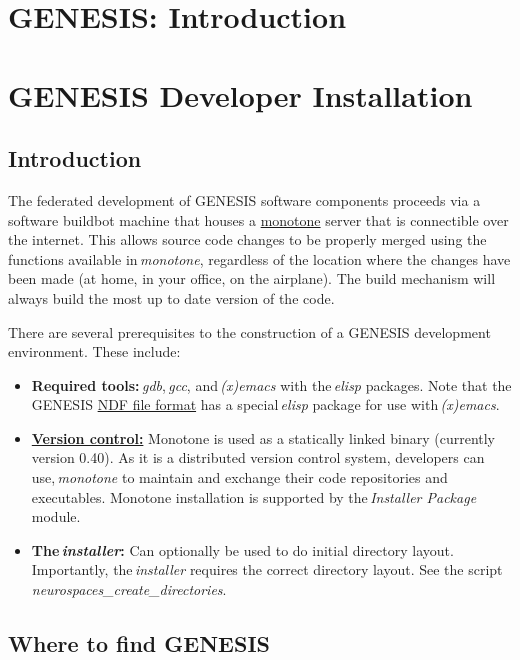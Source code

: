 \documentclass[12pt]{article}
\begin{document}
\section*{GENESIS: Introduction}

\section*{GENESIS Developer Installation}

\subsection*{Introduction}

The federated development of GENESIS software components proceeds via a software buildbot machine that houses a \href{http://monotone.ca/}{monotone} server that is connectible over the internet. This allows source code changes to be properly merged using the functions available in\,{\it monotone}, regardless of the location where the changes have been made (at home, in your office, on the airplane). The build mechanism will always build the most up to date version of the code.

There are several prerequisites to the construction of a GENESIS development environment. These include:

\begin{itemize}

\item {\bf Required tools:}\,{\it gdb},\,{\it gcc}, and\,{\it (x)emacs} with the\,{\it elisp} packages. Note that the GENESIS \href{../ndf-file-format/ndf-file-format.tex}{NDF file format} has a special\,{\it elisp} package for use with\,{\it (x)emacs}.
\item \href{../version-control/version-control.tex}{{\bf Version control:}} Monotone is used as a statically linked binary (currently version 0.40). As it is a distributed version control system, developers can use,\,{\it monotone} to maintain and exchange their code repositories and executables. Monotone installation is supported by the\,{\it Installer Package} module. 
\item {\bf  The\,{\it installer}:} Can optionally be used to do initial directory layout. Importantly, the\,{\it installer} requires the correct directory layout. See the script {\it neurospaces\_create\_directories}.

\end{itemize}

\subsection*{Where to find GENESIS}
\end{document}
